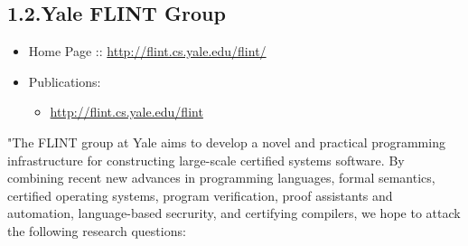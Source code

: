 \documentclass[12pt,twoside]{article}
\begin{document}
\subsection{1.2.\hspace*{0.5em}Yale FLINT Group}\label{sec-yale-flint-group}%

\begin{itemize}[noitemsep,topsep=\mdcompacttopsep]%

\item{}Home Page :: \href{http://flint.cs.yale.edu/flint/}{{\ttfamily http://\hspace{0pt}flint.\hspace{0pt}cs.\hspace{0pt}yale.\hspace{0pt}edu/\hspace{0pt}flint/\hspace{0pt}}}%

\item{}Publications:

\begin{itemize}[noitemsep,topsep=\mdcompacttopsep]%

\item{}\href{http://flint.cs.yale.edu/flint}{{\ttfamily http://\hspace{0pt}flint.\hspace{0pt}cs.\hspace{0pt}yale.\hspace{0pt}edu/\hspace{0pt}flint}}%
\end{itemize}%
\end{itemize}%

\noindent{}"The FLINT group at Yale aims to develop a novel and practical
programming infrastructure for constructing large-scale certified
systems software. By combining recent new advances in programming
languages, formal semantics, certified operating systems, program
verification, proof assistants and automation, language-based
secrurity, and certifying compilers, we hope to attack the following
research questions:%
\end{document}

